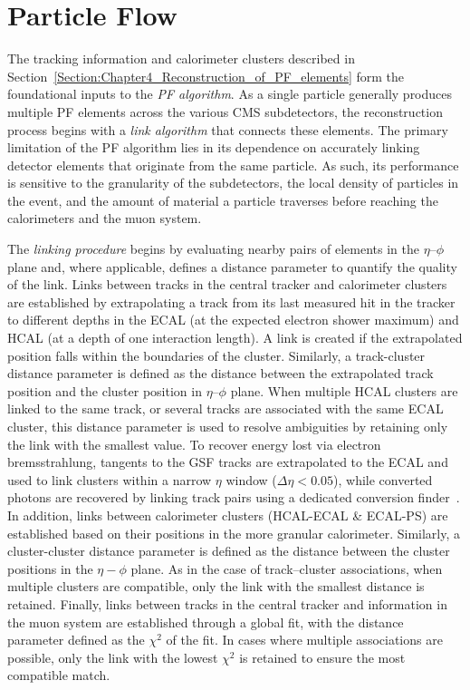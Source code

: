 \section{Particle Flow}
The tracking information and calorimeter clusters described in Section~\ref{Section:Chapter4_Reconstruction_of_PF_elements} form the foundational inputs to the \textit{PF algorithm}. As a single particle generally produces multiple PF elements across the various CMS subdetectors, the reconstruction process begins with a \textit{link algorithm} that connects these elements. The primary limitation of the PF algorithm lies in its dependence on accurately linking detector elements that originate from the same particle. As such, its performance is sensitive to the granularity of the subdetectors, the local density of particles in the event, and the amount of material a particle traverses before reaching the calorimeters and the muon system.

The \textit{linking procedure} begins by evaluating nearby pairs of elements in the $\eta$–$\phi$ plane and, where applicable, defines a distance parameter to quantify the quality of the link. Links between tracks in the central tracker and calorimeter clusters are established by extrapolating a track from its last measured hit in the tracker to different depths in the ECAL (at the expected electron shower maximum) and HCAL (at a depth of one interaction length). A link is created if the extrapolated position falls within the boundaries of the cluster. Similarly, a track-cluster distance parameter is defined as the distance between the extrapolated track position and the cluster position in $\eta$–$\phi$ plane. When multiple HCAL clusters are linked to the same track, or several tracks are associated with the same ECAL cluster, this distance parameter is used to resolve ambiguities by retaining only the link with the smallest value. To recover energy lost via electron bremsstrahlung, tangents to the GSF tracks are extrapolated to the ECAL and used to link clusters within a narrow $\eta$ window ($\Delta\eta < 0.05$), while converted photons are recovered by linking track pairs using a dedicated conversion finder~\cite{DedicatedConversionFinder}. In addition, links between calorimeter clusters (HCAL-ECAL \& ECAL-PS) are established based on their positions in the more granular calorimeter. Similarly, a cluster-cluster distance parameter is defined as the distance between the cluster positions in the $\eta-\phi$ plane. As in the case of track–cluster associations, when multiple clusters are compatible, only the link with the smallest distance is retained. Finally, links between tracks in the central tracker and information in the muon system are established through a global fit, with the distance parameter defined as the $\chi^2$ of the fit. In cases where multiple associations are possible, only the link with the lowest $\chi^2$ is retained to ensure the most compatible match.

